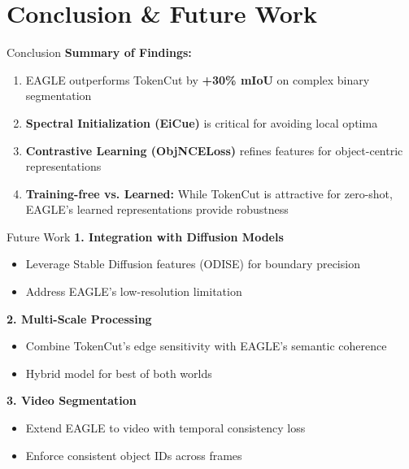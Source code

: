 \documentclass[aspectratio=169]{beamer}
\begin{document}
\section{Conclusion \& Future Work}
\begin{frame}{Conclusion}
\textbf{Summary of Findings:}
\begin{enumerate}
    \item EAGLE outperforms TokenCut by \textbf{+30\% mIoU} on complex binary segmentation
    \item \textbf{Spectral Initialization (EiCue)} is critical for avoiding local optima
    \item \textbf{Contrastive Learning (ObjNCELoss)} refines features for object-centric representations
    \item \textbf{Training-free vs. Learned:} While TokenCut is attractive for zero-shot, EAGLE's learned representations provide robustness
\end{enumerate}
\end{frame}
\begin{frame}{Future Work}
\textbf{1. Integration with Diffusion Models}
\begin{itemize}
    \item Leverage Stable Diffusion features (ODISE) for boundary precision
    \item Address EAGLE's low-resolution limitation
\end{itemize}
\vspace{0.3cm}
\textbf{2. Multi-Scale Processing}
\begin{itemize}
    \item Combine TokenCut's edge sensitivity with EAGLE's semantic coherence
    \item Hybrid model for best of both worlds
\end{itemize}
\vspace{0.3cm}
\textbf{3. Video Segmentation}
\begin{itemize}
    \item Extend EAGLE to video with temporal consistency loss
    \item Enforce consistent object IDs across frames
\end{itemize}
\end{frame}
\end{document}

